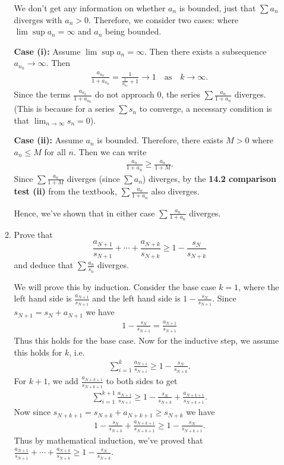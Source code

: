 \documentclass [10pt]{article}
\newcommand{\jg}[1]{{\color{blue} #1}}
\begin{document}
\begin{enumerate}
\begin{enumerate}
\jg{
We don't get any information on whether $a_n$ is bounded, just that $\sum a_n$ diverges with $a_n > 0$. Therefore, we consider two cases: where $\lim \sup a_n = \infty$ and $a_n$ being bounded. 

\textbf{Case (i):} Assume $\lim \sup a_n = \infty$. Then there exists a subsequence $a_{n_k} \rightarrow \infty$. Then 
\begin{align*}
    \frac{a_{n_k}}{1+a_{n_k}} = \frac{1}{\frac{1}{a_{n_k}} + 1} \rightarrow 1 \quad \text{as} \quad k \rightarrow \infty.
\end{align*}
Since the terms $\frac{a_{n_k}}{1+a_{n_k}}$ do not approach $0$, the series $\sum \frac{a_n}{1+a_n}$  diverges. (This is because for a series $\sum s_n$ to converge, a necessary condition is that $\lim_{n \rightarrow \infty} s_n = 0$). 

\textbf{Case (ii):} Assume $a_n$ is bounded. Therefore, there exists $M>0$ where $a_n \leq M$ for all $n$. Then we can write 
\begin{align*}
    \frac{a_n}{1+a_n} \geq \frac{a_n}{1+M} . 
\end{align*}
Since $\sum \frac{a_n}{1+M}$ diverges (since $\sum a_n$) diverges, by the \textbf{14.2 comparison test (ii)} from the textbook, $\sum \frac{a_n}{1 + a_n}$ also diverges. 

Hence, we've shown that in either case $\sum \frac{a_n}{1+a_n}$ diverges.
}

\item Prove that
$$
\frac{a_{N+1}}{s_{N+1}}+\cdots+\frac{a_{N+k}}{s_{N+k}} \geq 1-\frac{s_N}{s_{N+k}}
$$
and deduce that $\sum \frac{a_n}{s_n}$ diverges.

\jg{
We will prove this by induction. Consider the base case $k=1$, where the left hand side is $\frac{a_{N+1}}{s_{N+1}}$ and the left hand side is $1-\frac{s_N}{s_{N+1}}$. Since $s_{N+1} = s_N + a_{N+1}$ we have 
\begin{align*}
    1 - \frac{s_N}{s_{N+1}} = \frac{a_{N+1}}{s_{N+1}}
\end{align*}
Thus this holds for the base case. Now for the inductive step, we assume this holds for $k$, i.e. 
\begin{align*}
    \sum_{i=1}^k \frac{a_{N+i}}{s_{N+i}} \geq 1 - \frac{s_N}{s_{N+k}}.
\end{align*}
For $k+1$, we add $\frac{a_{N+k+1}}{s_{N+k+1}}$ to both sides to get
\begin{align*}
    \sum_{i=1}^{k+1} \frac{a_{N+1}}{s_{N+i}} \geq 1 - \frac{s_N}{s_{N+k}} + \frac{a_{N+k+1}}{s_{N+k+1}}.  
\end{align*}
Now since $s_{N + k + 1} = s_{N+k} + a_{N+k+1} \geq s_{N+k}$ we have
\begin{align*}
    1 - \frac{s_N}{s_{N+k}} + \frac{a_{N+k+1}}{s_{N+k+1}} \geq 1 - \frac{s_N}{s_{N+k+1}}.
\end{align*}
Thus by mathematical induction, we've proved that $\frac{a_{N+1}}{s_{N+1}}+\cdots+\frac{a_{N+k}}{s_{N+k}} \geq 1-\frac{s_N}{s_{N+k}}$. 

}
\end{enumerate}
\end{enumerate}
\end{document}
